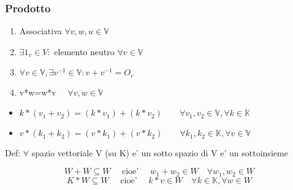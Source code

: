\documentclass{article}
\begin{document}
\subsubsection*{Prodotto}
\begin{enumerate}
	\item Associativa $\forall v,w,u \in \mathbb{V}$
	\item $\exists 1_v \in V: $ elemento neutro $\forall v \in \mathbb{V}$
	\item $\forall v \in  \mathbb{V},\exists v^{-1} \in \mathbb{V}:v+v^{-1}=O_v$
	\item v*w=w*v $\quad \forall v,w \in \mathbb{V}$
\end{enumerate}
\begin{itemize}
	\item $k*(v_1+v_2)=(k*v_1)+(k*v_2) \quad \quad \forall v_1,v_2 \in \mathbb{V}, \forall k \in \mathbb{K}$
	\item $v*(k_1+k_2)=(v*k_1)+(v*k_2) \quad \quad \forall k_1,k_2 \in \mathbb{K}, \forall v \in \mathbb{V}$
\end{itemize}
\begin{flushleft}
	Def: $\forall$ spazio vettoriale V (su K) e' un sotto spazio di V e' un sottoinsieme
\end{flushleft}
\begin{equation*}
	W+W \subseteq W \quad  \text{ cioe' } \quad w_1+w_2 \in W \quad \forall w_1,w_2 \in W
\end{equation*}
\begin{equation*}
	K*W \subseteq W \quad \text{ cioe' } \quad k*v \in W \quad \forall k \in \mathbb{K}, \forall w\in W
\end{equation*}
\end{document}
